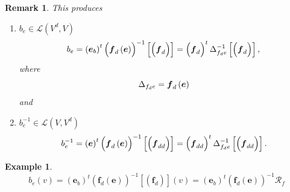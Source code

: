 \documentclass[aps,preprint]{revtex4}
\newtheorem{example}[theorem]{Example}
\newtheorem{remark}[theorem]{Remark}
\begin{document}
\begin{remark}
This produces

\begin{enumerate}
\item $b_{e}\in \mathcal{L}\left( V^{d},V\right) $%
\begin{equation}
b_{e}=\left( \overset{}{\boldsymbol{e}_{b}}\right) ^{t}\left( \overset{}{%
\boldsymbol{f}_{d}\left( \boldsymbol{e}\right) }\right) ^{-1}\left[ \left( 
\overset{}{\boldsymbol{f}_{d}}\right) \right] =\left( \overset{}{\boldsymbol{%
f}_{d}}\right) ^{t}{\LARGE \Delta }_{f_{d}e}^{-1}\left[ \left( \overset{}{%
\boldsymbol{f}_{d}}\right) \right] ,
\end{equation}%
where 
\begin{equation}
{\LARGE \Delta }_{f_{d}e}=\boldsymbol{f}_{d}\left( \boldsymbol{e}\right)
\end{equation}%
and

\item $b_{e}^{-1}\in \mathcal{L}\left( V,V^{d}\right) $%
\begin{equation}
b_{e}^{-1}=\left( \overset{}{\boldsymbol{e}}\right) ^{t}\left( \overset{}{%
\boldsymbol{f}_{d}\left( \boldsymbol{e}\right) }\right) ^{-1}\left[ \left( 
\overset{}{\boldsymbol{f}_{dd}}\right) \right] =\left( \overset{}{%
\boldsymbol{f}_{dd}}\right) ^{t}{\LARGE \Delta }_{f_{d}e}^{-1}\left[ \left( 
\overset{}{\boldsymbol{f}_{dd}}\right) \right] .
\end{equation}
\end{enumerate}
\end{remark}

\begin{example}
\begin{equation}
b_{e}\left( v\right) =\left( \overset{}{\boldsymbol{e}_{b}}\right)
^{t}\left( \overset{}{\boldsymbol{f}_{d}\left( \boldsymbol{e}\right) }%
\right) ^{-1}\left[ \left( \overset{}{\boldsymbol{f}_{d}}\right) \right]
\left( v\right) =\left( \overset{}{\boldsymbol{e}_{b}}\right) ^{t}\left( 
\overset{}{\boldsymbol{f}_{d}\left( \boldsymbol{e}\right) }\right) ^{-1}%
\mathcal{R}_{f}
\end{equation}
\end{example}
\end{document}
